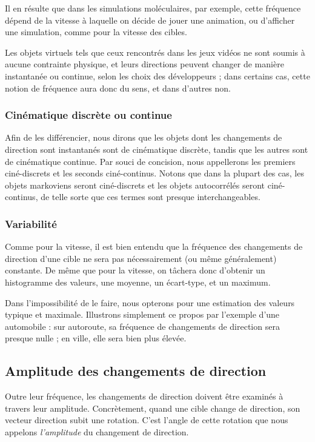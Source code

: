     Il en résulte que dans les simulations moléculaires, par exemple, cette fréquence dépend de la vitesse à laquelle on décide de jouer une animation, ou d'afficher une simulation, comme pour la vitesse des cibles.
    
    Les objets virtuels tels que ceux rencontrés dans les jeux vidéos ne sont soumis à aucune contrainte physique, et leurs directions peuvent changer de manière instantanée ou continue, selon les choix des développeurs ; dans certains cas, cette notion de fréquence aura donc du sens, et dans d'autres non.
    
    \subsubsection{Cinématique discrète ou continue}
    Afin de les différencier, nous dirons que les objets dont les changements de direction sont instantanés sont de cinématique discrète, tandis que les autres sont de cinématique continue. Par souci de concision, nous appellerons les premiers ciné-discrets et les seconds ciné-continus. Notons que dans la plupart des cas, les objets markoviens seront ciné-discrets et les objets autocorrélés seront ciné-continus, de telle sorte que ces termes sont presque interchangeables.
    
    \subsubsection{Variabilité}
    Comme pour la vitesse, il est bien entendu que la fréquence des changements de direction d'une cible ne sera pas nécessairement (ou même généralement) constante. De même que pour la vitesse, on tâchera donc d'obtenir un histogramme des valeurs, une moyenne, un écart-type, et un maximum.
    
    Dans l'impossibilité de le faire, nous opterons pour une estimation des valeurs \og typique \fg{} et maximale. Illustrons simplement ce propos par l'exemple d'une automobile : sur autoroute, sa fréquence de changements de direction sera presque nulle ; en ville, elle sera bien plus élevée.
    
	\subsection{Amplitude des changements de direction}
	Outre leur fréquence, les changements de direction doivent être examinés à travers leur amplitude. Concrètement, quand une cible change de direction, son vecteur direction subit une rotation. C'est l'angle de cette rotation que nous appelons \emph{l'amplitude} du changement de direction.
	
